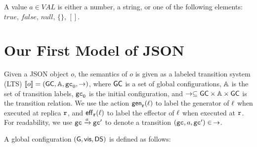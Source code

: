 
A value $a \in VAL$ is either a number, a string, or one of the following elements: $\mathit{true}$, $\mathit{false}$, $\mathit{null}$, $\{ \}$, $[ ]$.






\section{Our First Model of JSON}
\label{sec:our first model of json}

Given a JSON object $o$, the semantics of $o$ is given as a labeled transition system (LTS) $\llbracket o \rrbracket = (\mathsf{GC},\mathbb{A},\mathtt{gc}_0,\rightarrow)$, where $\mathsf{GC}$ is a set of global configurations, $\mathbb{A}$ is the set of transition labels, $\mathtt{gc}_0$ is the initial configuration, and $\rightarrow \subseteq \mathsf{GC} \times \mathbb{A}\times \mathsf{GC}$ is the transition relation. We use the action $\mathsf{gen}_{\mathtt{r}}(\ell)$ to label the generator of $\ell$ when executed at replica $\mathtt{r}$, and $\mathsf{eff}_{\mathtt{r}}(\ell)$ to label the effector of $\ell$ when executed at $\mathtt{r}$. For readability, we use $\mathtt{gc} \xrightarrow{a} \mathtt{gc}'$ to denote a transition $(\mathtt{gc},a,\mathtt{gc}')\in\,\rightarrow$.

A global configuration $(\mathsf{G}, \mathsf{vis}, \mathsf{DS})$ is defined as follows:

